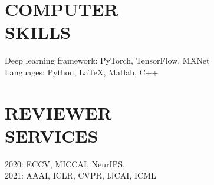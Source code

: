 \documentclass[margin]{res}
\begin{document}
\begin{resume}
\vspace{-1em}
\section{COMPUTER \\ SKILLS} 
                Deep learning framework: PyTorch, TensorFlow, MXNet\\
                Languages: Python, \LaTeX, Matlab, C++

\vspace{-1em}
\section{REVIEWER \\ SERVICES}
                2020: ECCV, MICCAI, NeurIPS,\\ 2021: AAAI, ICLR, CVPR, IJCAI, ICML

\end{resume}
\end{document}
